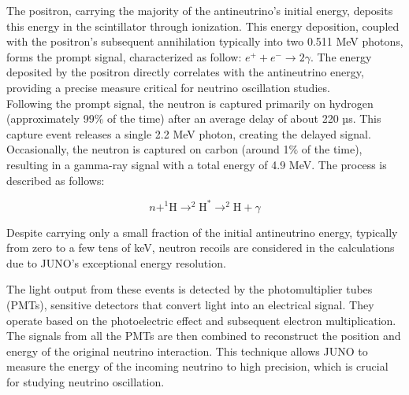 The positron, carrying the majority of the antineutrino's initial energy, deposits this energy in the scintillator through ionization. This energy deposition, coupled with the positron's subsequent annihilation typically into two 0.511 MeV photons, forms the prompt signal, characterized as follow: $e^{+} + e^{-} \rightarrow 2\gamma$.
The energy deposited by the positron directly correlates with the antineutrino energy, providing a precise measure critical for neutrino oscillation studies.\\

Following the prompt signal, the neutron is captured primarily on hydrogen (approximately 99$\%$ of the time) after an average delay of about 220 µs. This capture event releases a single 2.2 MeV photon, creating the delayed signal. Occasionally, the neutron is captured on carbon (around 1$\%$ of the time), resulting in a gamma-ray signal with a total energy of 4.9 MeV. The process is described as follows:

\begin{equation}
	 n + ^{1}\text{H} \rightarrow ^{2}\text{H}^{*} \rightarrow ^2\text{H} + \gamma
\end{equation}
 
Despite carrying only a small fraction of the initial antineutrino energy, typically from zero to a few tens of keV, neutron recoils are considered in the calculations due to JUNO's exceptional energy resolution.

The light output from these events is detected by the photomultiplier tubes (PMTs), sensitive detectors that convert light into an electrical signal. They operate based on the photoelectric effect and subsequent electron multiplication. The signals from all the PMTs are then combined to reconstruct the position and energy of the original neutrino interaction. This technique allows JUNO to measure the energy of the incoming neutrino to high precision, which is crucial for studying neutrino oscillation. %


